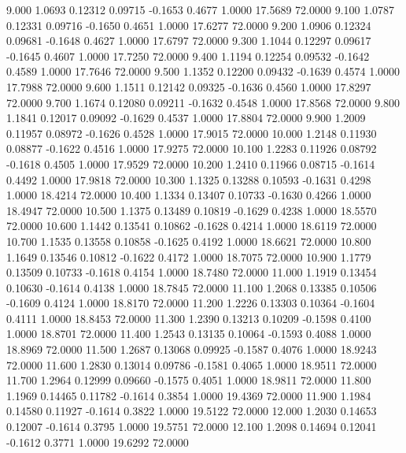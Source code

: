    9.000   1.0693   0.12312   0.09715  -0.1653   0.4677   1.0000  17.5689  72.0000
   9.100   1.0787   0.12331   0.09716  -0.1650   0.4651   1.0000  17.6277  72.0000
   9.200   1.0906   0.12324   0.09681  -0.1648   0.4627   1.0000  17.6797  72.0000
   9.300   1.1044   0.12297   0.09617  -0.1645   0.4607   1.0000  17.7250  72.0000
   9.400   1.1194   0.12254   0.09532  -0.1642   0.4589   1.0000  17.7646  72.0000
   9.500   1.1352   0.12200   0.09432  -0.1639   0.4574   1.0000  17.7988  72.0000
   9.600   1.1511   0.12142   0.09325  -0.1636   0.4560   1.0000  17.8297  72.0000
   9.700   1.1674   0.12080   0.09211  -0.1632   0.4548   1.0000  17.8568  72.0000
   9.800   1.1841   0.12017   0.09092  -0.1629   0.4537   1.0000  17.8804  72.0000
   9.900   1.2009   0.11957   0.08972  -0.1626   0.4528   1.0000  17.9015  72.0000
  10.000   1.2148   0.11930   0.08877  -0.1622   0.4516   1.0000  17.9275  72.0000
  10.100   1.2283   0.11926   0.08792  -0.1618   0.4505   1.0000  17.9529  72.0000
  10.200   1.2410   0.11966   0.08715  -0.1614   0.4492   1.0000  17.9818  72.0000
  10.300   1.1325   0.13288   0.10593  -0.1631   0.4298   1.0000  18.4214  72.0000
  10.400   1.1334   0.13407   0.10733  -0.1630   0.4266   1.0000  18.4947  72.0000
  10.500   1.1375   0.13489   0.10819  -0.1629   0.4238   1.0000  18.5570  72.0000
  10.600   1.1442   0.13541   0.10862  -0.1628   0.4214   1.0000  18.6119  72.0000
  10.700   1.1535   0.13558   0.10858  -0.1625   0.4192   1.0000  18.6621  72.0000
  10.800   1.1649   0.13546   0.10812  -0.1622   0.4172   1.0000  18.7075  72.0000
  10.900   1.1779   0.13509   0.10733  -0.1618   0.4154   1.0000  18.7480  72.0000
  11.000   1.1919   0.13454   0.10630  -0.1614   0.4138   1.0000  18.7845  72.0000
  11.100   1.2068   0.13385   0.10506  -0.1609   0.4124   1.0000  18.8170  72.0000
  11.200   1.2226   0.13303   0.10364  -0.1604   0.4111   1.0000  18.8453  72.0000
  11.300   1.2390   0.13213   0.10209  -0.1598   0.4100   1.0000  18.8701  72.0000
  11.400   1.2543   0.13135   0.10064  -0.1593   0.4088   1.0000  18.8969  72.0000
  11.500   1.2687   0.13068   0.09925  -0.1587   0.4076   1.0000  18.9243  72.0000
  11.600   1.2830   0.13014   0.09786  -0.1581   0.4065   1.0000  18.9511  72.0000
  11.700   1.2964   0.12999   0.09660  -0.1575   0.4051   1.0000  18.9811  72.0000
  11.800   1.1969   0.14465   0.11782  -0.1614   0.3854   1.0000  19.4369  72.0000
  11.900   1.1984   0.14580   0.11927  -0.1614   0.3822   1.0000  19.5122  72.0000
  12.000   1.2030   0.14653   0.12007  -0.1614   0.3795   1.0000  19.5751  72.0000
  12.100   1.2098   0.14694   0.12041  -0.1612   0.3771   1.0000  19.6292  72.0000
